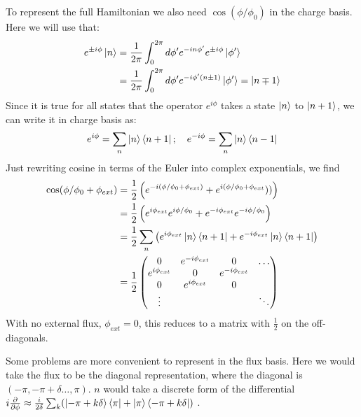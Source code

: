 To represent the full Hamiltonian we also need $\cos(\phi / \phi_0)$ in the charge basis. Here we will use that:
\begin{align*}
    e^{\pm i \phi}\ket{n} &=  \frac{1}{2\pi} \int_0^{2\pi} d \phi' e^{-in\phi'} e^{\pm i \phi}\ket{\phi'} \\
                          &=  \frac{1}{2\pi} \int_0^{2\pi} d \phi' e^{-i\phi'(n\pm 1)} \ket{\phi'} = \ket{n\mp 1}    
\end{align*}
Since it is true for all states that the operator $e^{i\phi}$ takes a state $\ket{n}$ to $\ket{n+1}$, we can write it in charge basis as:
\begin{equation}
    e^{i\phi} = \sum_n \ket{n}\bra{n+1}; \quad e^{-i\phi} = \sum_n  \ket{n}\bra{n-1}
\end{equation}
Just rewriting cosine in terms of the Euler into complex exponentials, we find 
\begin{align}
    \cos(\phi/\phi_0 + \phi_{ext}) &= \frac12 \left(e^{-i(\phi/\phi_0 + \phi_{ext})} + e^{i(\phi/\phi_0 + \phi_{ext}}))\right) \nonumber\\
    &= \frac12 \left(e^{i\phi_{ext}}e^{i\phi/\phi_0} + e^{-i\phi_{ext}}e^{-i\phi/\phi_0}\right)  \nonumber \\
    &= \frac12 \sum_n \left(e^{i\phi_{ext}} \ket{n}\bra{n + 1} + e^{-i\phi_{ext}} \ket{n}\bra{n+ 1}   \right) \nonumber \\
    &= \frac12 \begin{pmatrix}
        0 & e^{-i\phi_{ext}} & 0 & \hdots \\
        e^{i\phi_{ext}} & 0 & e^{-i\phi_{ext}} \\
        0 & e^{i\phi_{ext}} & 0 & \\
        \vdots & & & \ddots 
    \end{pmatrix}
\end{align}
With no external flux, $\phi_{ext} = 0$, this reduces to a matrix with $\frac12$ on the off-diagonals.

Some problems are more convenient to represent in the flux basis. Here we would take the flux to be the diagonal representation, where the diagonal is $(-\pi, -\pi + \delta \dots, \pi)$. $n$ would take a discrete form of the differential $i\frac{\partial }{\partial \phi} \approx \frac{i}{2\delta} \sum_k (\ket{-\pi + k\delta}\bra{\pi} + \ket{\pi}\bra{-\pi + k\delta})$ \cite{aumann_circuitq_2022}.


